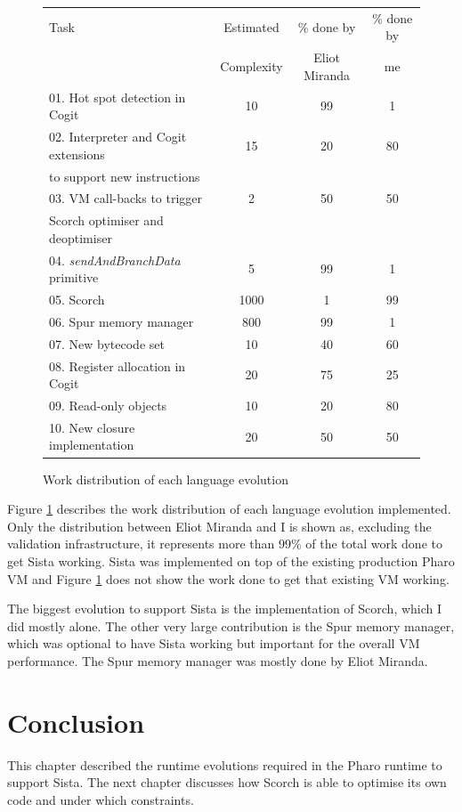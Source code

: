 \documentclass[a4paper,12pt,twoside]{../includes/ThesisStyle}
\begin{document}
\begin{figure}[h!]
	\noindent \begin{tabular}{l|c|c|c}
		Task & Estimated & \% done by & \% done by \\
		 & Complexity & Eliot Miranda &  me \\
		\midrule
		\midrule
		01. Hot spot detection in Cogit & 10 & 99 & 1 \\
		\midrule
		02. Interpreter and Cogit extensions & 15 & 20 & 80 \\
		to support new instructions & & & \\
		\midrule
		03. VM call-backs to trigger & 2 & 50 & 50 \\
		Scorch optimiser and deoptimiser & & & \\
		\midrule
		04. \emph{sendAndBranchData} primitive & 5 & 99 & 1 \\
		\midrule
		05. Scorch & 1000 & 1 & 99 \\
		\midrule
		\midrule
		06. Spur memory manager & 800 & 99 & 1 \\
		\midrule
		07. New bytecode set & 10 & 40 & 60 \\
		\midrule
		08. Register allocation in Cogit & 20 & 75 & 25 \\
		\midrule
		09. Read-only objects & 10 & 20 & 80 \\
		\midrule
		10. New closure implementation & 20 & 50 & 50 \\
	\end{tabular}
    \caption{Work distribution of each language evolution}
    \label{tab:WorkDistrib}
\end{figure}

Figure \ref{tab:WorkDistrib} describes the work distribution of each language evolution implemented. Only the distribution between Eliot Miranda and I is shown as, excluding the validation infrastructure, it represents more than 99\% of the total work done to get Sista working. Sista was implemented on top of the existing production Pharo VM and Figure \ref{tab:WorkDistrib} does not show the work done to get that existing VM working. 

The biggest evolution to support Sista is the implementation of Scorch, which I did mostly alone. The other very large contribution is the Spur memory manager, which was optional to have Sista working but important for the overall VM performance. The Spur memory manager was mostly done by Eliot Miranda.


\section*{Conclusion}

This chapter described the runtime evolutions required in the Pharo runtime to support Sista. The next chapter discusses how Scorch is able to optimise its own code and under which constraints.

\ifx\wholebook\relax\else
    
\end{document}
